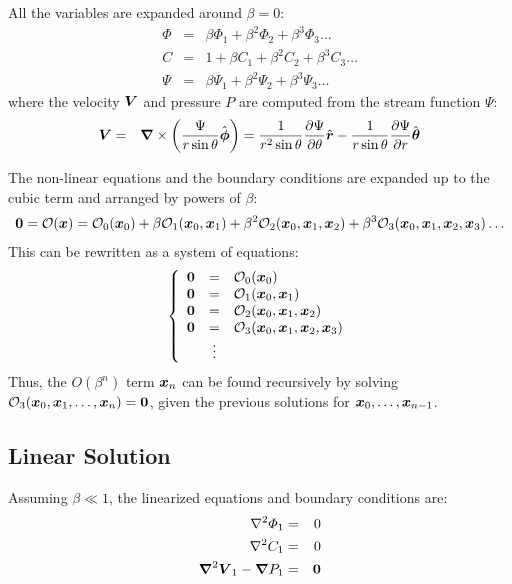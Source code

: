 All the variables are expanded around $\beta = 0$:
\begin{eqnarray}
\varPhi &=& \beta \varPhi_1 + \beta^2 \varPhi_2 + \beta^3 \varPhi_3 \ldots \\
C &=& 1 + \beta C_1 + \beta^2 C_2 + \beta^3 C_3 \ldots \\
\Psi &=& \beta \Psi_1 + \beta^2 \Psi_2 + \beta^3 \Psi_3 \ldots 
\end{eqnarray}
where the velocity $\bV$ and pressure $P$ are computed from the stream function $\Psi$:
\begin{eqnarray}
\bV &=& \bnabla \times \pars{\frac{\Psi}{r \sin\theta} \bphihat} 
= \frac{1}{r^2 \sin\theta} \deriv{\Psi}{\theta} \brhat 
- \frac{1}{r \sin\theta} \deriv{\Psi}{r} \bthetahat
\end{eqnarray}

The non-linear equations and the boundary conditions are expanded up to the cubic term
and arranged by powers of $\beta$:
\begin{eqnarray}
\bzero = \cO(\bx) = \cO_0(\bx_0) 
   + \beta \cO_1(\bx_0, \bx_1) 
 + \beta^2 \cO_2(\bx_0, \bx_1, \bx_2) 
 + \beta^3 \cO_3(\bx_0, \bx_1, \bx_2, \bx_3) \ldots
\end{eqnarray}
This can be rewritten as a system of equations:
\begin{eqnarray}
\brc{rcl}{
\bzero &=& \cO_0(\bx_0) \\
\bzero &=& \cO_1(\bx_0, \bx_1) \\
\bzero &=& \cO_2(\bx_0, \bx_1, \bx_2) \\
\bzero &=& \cO_3(\bx_0, \bx_1, \bx_2, \bx_3) \\
& \vdots &  }
\end{eqnarray}
Thus, the $O(\beta^n)$ term $\bx_n$ can be found recursively by solving 
$\cO_3(\bx_0, \bx_1, \ldots, \bx_n) = \bzero$,
given the previous solutions for $\bx_0, \ldots, \bx_{n-1}$.

\subsection{Linear Solution}

Assuming $\beta \ll 1$, the linearized equations and boundary conditions are:
\begin{eqnarray}
\Laplacian \varPhi_1 &=& 0 \\
\Laplacian C_1 &=& 0 \\
\bLaplacian \bV_1 - \bnabla P_1 &=& \bzero
\end{eqnarray}

